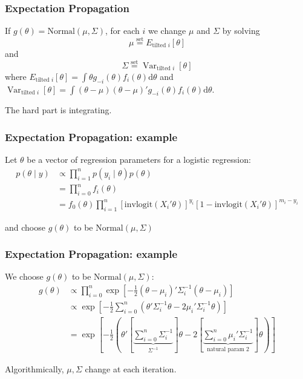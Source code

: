 \documentclass{beamer}
\begin{document}
\begin{frame}[fragile]
\frametitle{Expectation Propagation}

If $g(\theta) = \text{Normal}(\mu, \Sigma)$, for each $i$ we change $\mu$ and $\Sigma$ by solving
$$
\mu \overset{\text{set}}{=} E_{\text{tilted }i}[\theta] 
$$
and
$$
\Sigma \overset{\text{set}}{=} \operatorname{Var}_{\text{tilted }i}[\theta] 
$$
where $E_{\text{tilted }i}[\theta] = \int \theta g_{-i}(\theta)f_i(\theta) \text{d}\theta $ and $\operatorname{Var}_{\text{tilted }i}[\theta] = \int (\theta-\mu)(\theta-\mu)' g_{-i}(\theta)f_i(\theta) \text{d}\theta $.
\newline

The hard part is integrating.
\end{frame}
\begin{frame}[fragile]
\frametitle{Expectation Propagation: example}

Let $\theta$ be a vector of regression parameters for a logistic regression:
\begin{align*}
p(\theta \mid y) &\propto \prod_{i=1}^n p(y_i \mid \theta)p(\theta) \\
&= \prod_{i=0}^n f_i(\theta) \\
&= f_0(\theta) \prod_{i=1}^n [\text{invlogit}(X_i'\theta )]^{y_i}[1-\text{invlogit}(X_i'\theta)]^{m_i - y_i}
\end{align*}

and choose $g(\theta)$ to be $\text{Normal}(\mu, \Sigma)$

\end{frame}
\begin{frame}[fragile]
\frametitle{Expectation Propagation: example}

We choose $g(\theta)$ to be $\text{Normal}(\mu, \Sigma)$:
\begin{align*}
g(\theta) 
&\propto \prod_{i=0}^n \exp\left[-\frac{1}{2}(\theta - \mu_i)'\Sigma^{-1}_i(\theta - \mu_i)  \right] \\
&\propto  \exp\left[-\frac{1}{2}\sum_{i=0}^n\left( \theta'\Sigma^{-1}_i\theta - 2 \mu_i' \Sigma^{-1}_i\theta \right) \right] \\
&=  \exp\left[-\frac{1}{2}\left( \theta'\left[\underbrace{ \sum_{i=0}^n \Sigma^{-1}_i}_{\Sigma^{-1} }\right] \theta - 2 \left[\underbrace{\sum_{i=0}^n\mu_i' \Sigma^{-1}_i}_{ \text{natural param 2} } \right]\theta \right) \right]
\end{align*}

Algorithmically, $\mu, \Sigma$ change at each iteration.
\end{frame}
\end{document}
